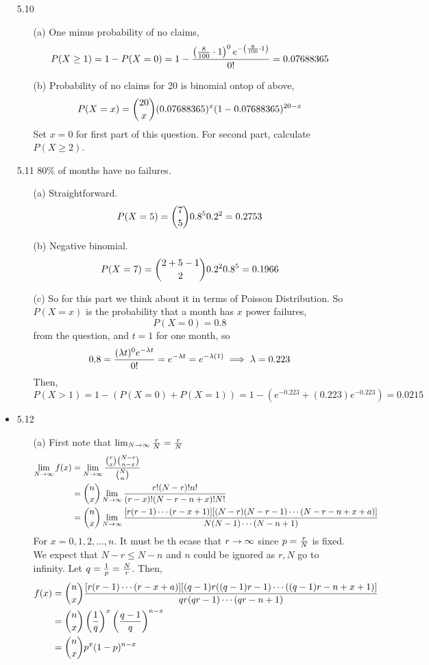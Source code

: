 \documentclass[english, 11pt]{article}
\begin{document}
\begin{itemize}
    \item[5.10]
    \begin{itemize}
      \item[(a)] One minus probability of no claims,
      \[ P(X \geq 1) = 1- P(X = 0) =  1 - \frac{\left( \frac{8}{100} \cdot 1 \right)^0e^{-\left( \frac{8}{100} \cdot 1 \right)}}{0!} = 0.07688365 \]

      \item[(b)] Probability of no claims for 20 is binomial ontop of above,
      \[ P(X = x) = {20 \choose x} (0.07688365)^x (1-0.07688365)^{20-x} \]
      Set $x = 0$ for first part of this question. For second part, calculate $P(X \geq 2)$.
    \end{itemize}

    \item[5.11] 80\% of months have no failures.
    \begin{itemize}
      \item[(a)] Straightforward.
      \[ P(X = 5) = {7 \choose 5} 0.8^5 0.2^2 = 0.2753 \]
      \item[(b)] Negative binomial.
      \[ P(X = 7) = {2 + 5 - 1 \choose 2}0.2^20.8^5= 0.1966 \]
      \item[(c)] So for this part we think about it in terms of Poisson Distribution. So $P(X = x)$ is the probability that a month has $x$ power failures,
      \[ P(X = 0) = 0.8 \]
      from the question, and $t = 1$ for one month, so
      \[ 0.8 = \frac{(\lambda t)^0 e^{-\lambda t}}{0!} = e^{-\lambda t} = e^{-\lambda(1)} \implies \lambda = 0.223 \]
      Then,
      \[ P(X > 1) = 1 - (P(X = 0) + P(X = 1)) = 1 - (e^{-0.223} + (0.223)e^{-0.223}) = 0.0215 \]
    \end{itemize}

    \item{5.12}
    \begin{itemize}
      \item[(a)] First note that $ \lim_{N \rightarrow \infty} \frac{r}{N} = \frac{r}{N}$
      \begin{align*}
        \lim_{N \rightarrow \infty} f(x) & =  \lim_{N \rightarrow \infty} \frac{{r \choose x}{N-r \choose n-x}}{{N \choose n}}\\
        & =  {n \choose x} \lim_{N \rightarrow \infty} \frac{r!(N-r)!n!}{(r-x)!(N - r - n + x)!N!} \\
        & =  {n \choose x} \lim_{N \rightarrow \infty} \frac{[r(r-1)\cdots(r-x+1)][(N - r)(N - r - 1)\cdots(N - r - n + x + a)]}{N(N-1)\cdots(N-n +1)}
      \end{align*}
      For $x = 0,1,2,\ldots,n$. It must be th ecase that $r \rightarrow \infty$ since $p = \frac{r}{N}$ is fixed. We expect that $N - r \leq N - n$ and $n$ could be ignored as $r, N$ go to infinity. Let $q = \frac{1}{p} = \frac{N}{r}$. Then,
      \begin{align*}
        f(x) & = {n \choose x} \frac{[r(r-1)\cdots(r-x+a)][(q-1)r((q-1)r-1)\cdots((q-1)r-n+x+1)]}{qr(qr-1)\cdots(qr-n+1)} \\
        & = {n \choose x}\left( \frac{1}{q} \right)^x \left( \frac{q-1}{q} \right)^{n-x} \\
        & = {n \choose x} p^x (1-p)^{n-x}
      \end{align*}
    \end{itemize}


\end{itemize}
\end{document}
